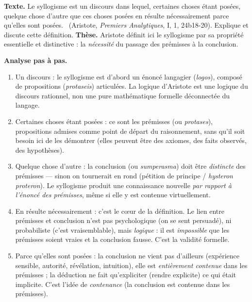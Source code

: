 \documentclass[11pt]{article}
\newcommand{\cle}[1]{{\popxbold\color{popdark}#1}}
\begin{document}
\begin{exoresolu}
\textbf{Texte.} \guillemotleft Le syllogisme est un discours dans lequel, certaines choses étant posées, quelque chose d'autre que ces choses posées en résulte nécessairement parce qu'elles sont posées. \guillemotright\ (Aristote, \emph{Premiers Analytiques}, I, 1, 24b18-20). Explique et discute cette définition.
\tcblower
\textbf{Thèse.} Aristote définit ici le syllogisme par sa propriété essentielle et distinctive : la \emph{nécessité} du passage des prémisses à la conclusion.

\textbf{Analyse pas à pas.}
\begin{enumerate}
\item \guillemotleft Un discours \guillemotright : le syllogisme est d'abord un énoncé langagier (\emph{logos}), composé de propositions (\emph{protaseis}) articulées. La logique d'Aristote est une logique du discours rationnel, non une pure mathématique formelle déconnectée du langage.
\item \guillemotleft Certaines choses étant posées \guillemotright : ce sont les \cle{prémisses} (ou \emph{protases}), propositions admises comme point de départ du raisonnement, sans qu'il soit besoin ici de les démontrer (elles peuvent être des axiomes, des faits observés, des hypothèses).
\item \guillemotleft Quelque chose d'autre \guillemotright : la \cle{conclusion} (ou \emph{sumperasma}) doit être \emph{distincte} des prémisses — sinon on tournerait en rond (pétition de principe / \emph{hysteron proteron}). Le syllogisme produit une connaissance nouvelle \emph{par rapport à l'énoncé des prémisses}, même si elle y est contenue virtuellement.
\item \guillemotleft En résulte nécessairement \guillemotright : c'est le cœur de la définition. Le lien entre prémisses et conclusion n'est pas psychologique (on se sent persuadé), ni probabiliste (c'est vraisemblable), mais \emph{logique} : il est \emph{impossible} que les prémisses soient vraies et la conclusion fausse. C'est la \cle{validité} formelle.
\item \guillemotleft Parce qu'elles sont posées \guillemotright : la conclusion ne vient pas d'ailleurs (expérience sensible, autorité, révélation, intuition), elle est \emph{entièrement contenue} dans les prémisses ; la déduction ne fait qu'expliciter (rendre explicite) ce qui était implicite. C'est l'idée de \emph{contenance} (la conclusion est contenue dans les prémisses).
\end{enumerate}


\end{exoresolu}
\end{document}
